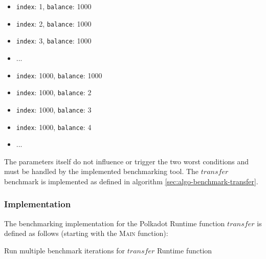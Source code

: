 \documentclass[11pt,a4paper]{article}
\begin{document}
\begin{itemize}
  \item \verb|index|: 1, \verb|balance|: 1000
  \item \verb|index|: 2, \verb|balance|: 1000
  \item \verb|index|: 3, \verb|balance|: 1000
  \item ...
  \item \verb|index|: 1000, \verb|balance|: 1000
  \item \verb|index|: 1000, \verb|balance|: 2
  \item \verb|index|: 1000, \verb|balance|: 3
  \item \verb|index|: 1000, \verb|balance|: 4
  \item ...
\end{itemize}

The parameters itself do not influence or trigger the two worst conditions and must be handled by
the implemented benchmarking tool. The $transfer$ benchmark is implemented as defined in algorithm
\ref{sec:algo-benchmark-transfer}.

\subsubsection*{Implementation}
The benchmarking implementation for the Polkadot Runtime function $transfer$ is defined as
follows (starting with the \textsc{Main} function):
\newline


\begin{algorithm}[H]\label{sec:algo-benchmark-transfer}
  \caption{Run multiple benchmark iterations for $transfer$ Runtime function}
  \SetAlgoLined
  \BlankLine
  \BlankLine
\end{algorithm}
\end{document}
